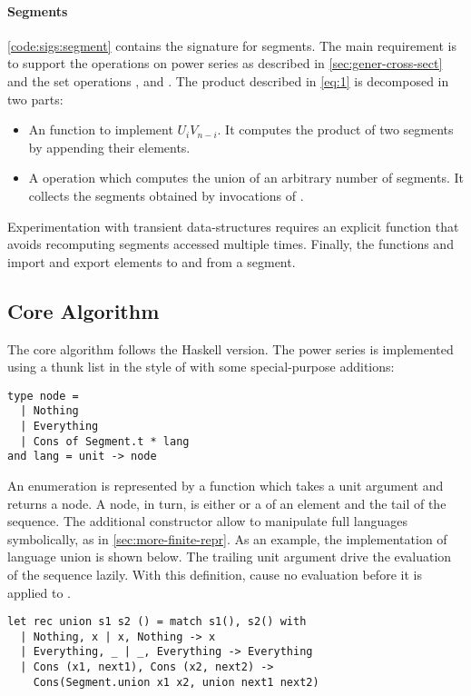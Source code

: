 \paragraph{Segments}

\autoref{code:sigs:segment} contains the signature for segments.
The main requirement is to support the operations on power series as described in \autoref{sec:gener-cross-sect} and the set operations
,  and .
%
The product described in \autoref{eq:1} is decomposed in two parts:
\begin{itemize}[leftmargin=*]
\item An  function to implement $U_i V_{n-i}$. It computes the
  product of two segments by appending their elements.
\item A  operation which computes the union of an arbitrary number
  of segments. It collects the segments obtained
  by invocations of .
\end{itemize}
%
Experimentation with transient data-structures requires
an explicit  function that avoids recomputing segments accessed
multiple times. 
%
Finally, the functions   and  import and
export elements to and from a segment.

\subsection{Core Algorithm}

The core algorithm follows the Haskell version. The power series
is implemented using a thunk list in the style of \citet{DBLP:conf/cpp/Pottier17}
with some special-purpose additions:
\begin{lstlisting}
type node =
  | Nothing
  | Everything
  | Cons of Segment.t * lang
and lang = unit -> node
\end{lstlisting}
%
An enumeration is represented by a function which takes a unit argument and returns
a node. A node, in turn, is either  or a  of an
element and the tail of the sequence.
The additional constructor  allow to manipulate
full languages symbolically, as in \cref{sec:more-finite-repr}.
%
As an example, the implementation of language union is shown below.
The trailing unit argument \code{()} drive the evaluation of the
sequence lazily. With this definition,  cause no
evaluation before it is applied to \code{()}.
\begin{lstlisting}
let rec union s1 s2 () = match s1(), s2() with
  | Nothing, x | x, Nothing -> x
  | Everything, _ | _, Everything -> Everything
  | Cons (x1, next1), Cons (x2, next2) -> 
    Cons(Segment.union x1 x2, union next1 next2)
\end{lstlisting}

